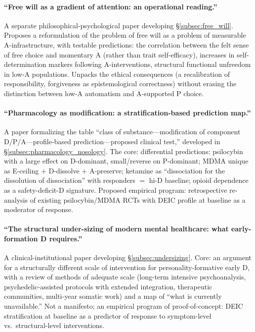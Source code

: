 \paragraph{``Free will as a gradient of attention: an operational reading.''} A separate philosophical-psychological paper developing §\ref{subsec:free_will}. Proposes a reformulation of the problem of free will as a problem of measurable A-infrastructure, with testable predictions: the correlation between the felt sense of free choice and momentary A (rather than trait self-efficacy), increases in self-determination markers following A-interventions, structural functional unfreedom in low-A populations. Unpacks the ethical consequences (a recalibration of responsibility, forgiveness as epistemological correctness) without erasing the distinction between low-A automatism and A-supported P choice.

\paragraph{``Pharmacology as \DEIC{} modification: a stratification-based prediction map.''} A paper formalizing the table ``class of substance---modification of component D/P/A---profile-based prediction---proposed clinical test,'' developed in §\ref{subsec:pharmacology_nosology}. The core: differential predictions: psilocybin with a large effect on D-dominant, small/reverse on P-dominant; MDMA unique as E-ceiling $+$ D-dissolve $+$ A-preserve; ketamine as ``dissociation for the dissolution of dissociation'' with responders $=$ hi-D baseline; opioid dependence as a safety-deficit-D signature. Proposed empirical program: retrospective re-analysis of existing psilocybin/MDMA RCTs with DEIC profile at baseline as a moderator of response.

\paragraph{``The structural under-sizing of modern mental healthcare: what early-formation D requires.''} A clinical-institutional paper developing §\ref{subsec:undersizing}. Core: an argument for a structurally different scale of intervention for personality-formative early D, with a review of methods of adequate scale (long-term intensive psychoanalysis, psychedelic-assisted protocols with extended integration, therapeutic communities, multi-year somatic work) and a map of ``what is currently unavailable.'' Not a manifesto; an empirical program of proof-of-concept: DEIC stratification at baseline as a predictor of response to symptom-level vs.\ structural-level interventions.

